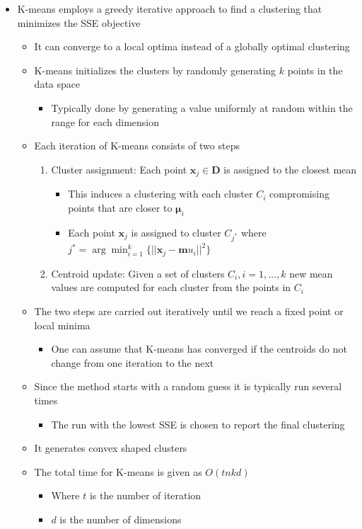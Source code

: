 \documentclass[11pt]{article}
\begin{document}
\begin{itemize}
\item K-means employs a greedy iterative approach to find a clustering that minimizes the SSE objective
\begin{itemize}
\item It can converge to a local optima instead of a globally optimal clustering
\item K-means initializes the clusters by randomly generating \(k\) points in the data space
\begin{itemize}
\item Typically done by generating a value uniformly at random within the range for each dimension
\end{itemize}
\item Each iteration of K-means consists of two steps
\begin{enumerate}
\item Cluster assignment: Each point \(\pmb x_j \in \mathbf D\) is assigned to the closest mean
\begin{itemize}
\item This induces a clustering with each cluster \(C_i\) compromising points that are closer to \(\pmb \mu_i\)
\item Each point \(\pmb x_j\) is assigned to cluster \(C_{j^*}\) where \(j^*=\arg\min_{i=1}^k \{||\pmb x_j - \pmb mu_i ||^2\}\)
\end{itemize}
\item Centroid update: Given a set of clusters \(C_i, i=1, \dots, k\) new mean values are computed for each cluster from the points in \(C_i\)
\end{enumerate}
\item The two steps are carried out iteratively until we reach a fixed point or local minima
\begin{itemize}
\item One can assume that K-means has converged if the centroids do not change from one iteration to the next
\end{itemize}
\item Since the method starts with a random guess it is typically run several times
\begin{itemize}
\item The run with the lowest SSE is chosen to report the final clustering
\end{itemize}
\item It generates convex shaped clusters
\item The total time for K-means is given as \(O(tnkd)\)
\begin{itemize}
\item Where \(t\) is the number of iteration
\item \(d\) is the number of dimensions
\end{itemize}
\end{itemize}
\end{itemize}
\end{document}
